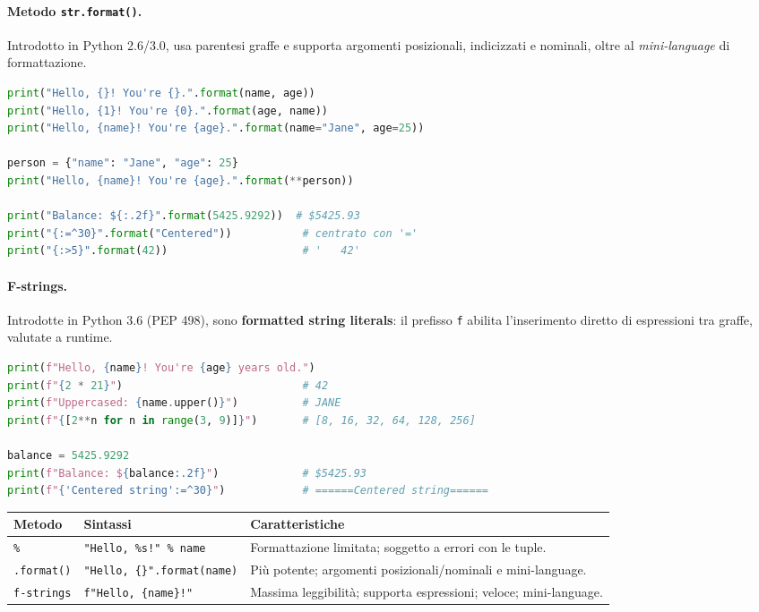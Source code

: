 \documentclass[12pt]{extarticle}
\begin{document}
\paragraph{Metodo \texttt{str.format()}.} Introdotto in Python 2.6/3.0, usa parentesi graffe e supporta argomenti posizionali, indicizzati e nominali, oltre al \textit{mini-language} di formattazione.

\begin{lstlisting}[language=Python]
print("Hello, {}! You're {}.".format(name, age))
print("Hello, {1}! You're {0}.".format(age, name))
print("Hello, {name}! You're {age}.".format(name="Jane", age=25))

person = {"name": "Jane", "age": 25}
print("Hello, {name}! You're {age}.".format(**person))

print("Balance: ${:.2f}".format(5425.9292))  # $5425.93
print("{:=^30}".format("Centered"))           # centrato con '='
print("{:>5}".format(42))                     # '   42'
\end{lstlisting}

\paragraph{F-strings.} Introdotte in Python 3.6 (PEP 498), sono \textbf{formatted string literals}: il prefisso \texttt{f} abilita l'inserimento diretto di espressioni tra graffe, valutate a runtime.

\begin{lstlisting}[language=Python]
print(f"Hello, {name}! You're {age} years old.")
print(f"{2 * 21}")                            # 42
print(f"Uppercased: {name.upper()}")          # JANE
print(f"{[2**n for n in range(3, 9)]}")       # [8, 16, 32, 64, 128, 256]

balance = 5425.9292
print(f"Balance: ${balance:.2f}")             # $5425.93
print(f"{'Centered string':=^30}")            # ======Centered string======
\end{lstlisting}

\begin{center}
\small
\begin{tabular}{p{2.4cm}p{4.4cm}p{7.4cm}}
    \toprule
    \textbf{Metodo} & \textbf{Sintassi} & \textbf{Caratteristiche} \\
    \midrule
    \texttt{\%} & \texttt{"Hello, \%s!" \% name} & Formattazione limitata; soggetto a errori con le tuple. \\
    \addlinespace
    \texttt{.format()} & \texttt{"Hello, \{\}".format(name)} & Più potente; argomenti posizionali/nominali e mini-language. \\
    \addlinespace
    \texttt{f-strings} & \texttt{f"Hello, \{name\}!"} & Massima leggibilità; supporta espressioni; veloce; mini-language. \\
    \bottomrule
\end{tabular}
\end{center}
\end{document}
